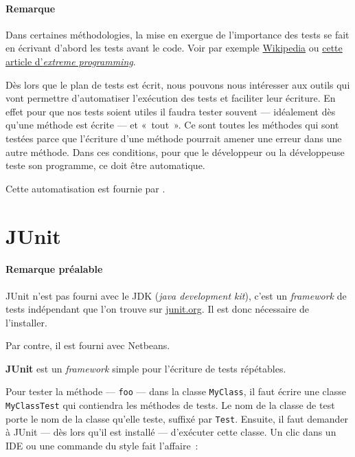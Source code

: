 \paragraph{Remarque} Dans certaines méthodologies, la mise en exergue de l'importance des tests se fait en écrivant d'abord les tests avant le code.
Voir par exemple \href{https://fr.wikipedia.org/wiki/Test_driven_development}{Wikipedia} ou \href{http://www.extremeprogramming.org/rules/testfirst.html}{cette article d'\textit{extreme programming}}\cite{testfirst}. 

Dès lors que le plan de tests est écrit, nous pouvons nous intéresser aux outils
qui vont permettre d'automatiser l'exécution des tests et faciliter leur
écriture.  En effet pour que nos tests soient utiles il faudra tester souvent
— idéalement dès qu'une méthode est écrite — et «~tout~». Ce sont toutes les
méthodes qui sont testées parce que l'écriture d'une méthode pourrait amener une
erreur dans une autre méthode. Dans ces conditions, pour que le développeur ou
la développeuse teste son programme, ce doit être automatique.  

Cette automatisation est fournie par .



\section{JUnit}

\paragraph{Remarque préalable} JUnit n'est pas fourni avec le JDK (\textit{java
development kit}), c'est un \textit{framework} de tests indépendant que l'on
trouve sur \url{junit.org}. Il est donc nécessaire de l'installer. 

Par contre, il est fourni avec Netbeans. 

\textbf{JUnit} est un \textit{framework} simple pour l'écriture de tests
répétables. 

Pour tester la méthode — \texttt{foo} — dans la classe \texttt{MyClass}, il faut
écrire une classe \texttt{MyClassTest} qui contiendra les méthodes de tests.  Le
nom de la classe de test porte le nom de la classe qu'elle teste, suffixé par
\texttt{Test}. Ensuite, il faut demander à JUnit — dès lors qu'il est installé
— d'exécuter cette classe. Un clic dans un IDE ou une commande du style fait
l'affaire~:

